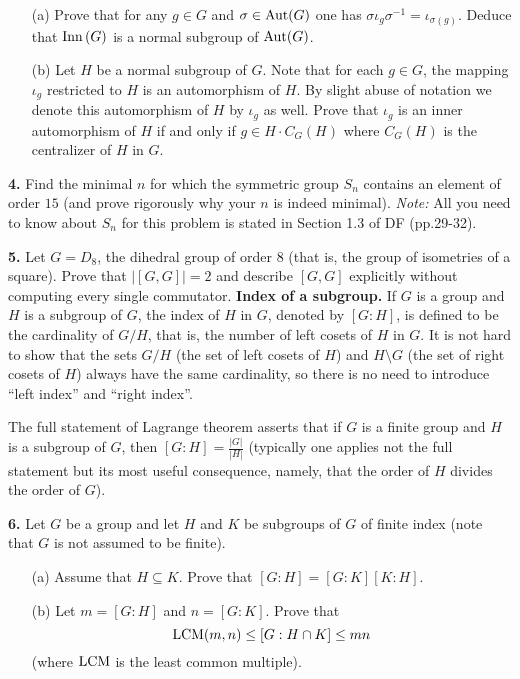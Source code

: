 \documentclass[12pt]{amsart}
\begin{document}
\begin{itemize}
\item[(a)] Prove that for any $g\in G$ and $\sigma\in {\rm Aut}(G)$
one has $\sigma \iota_g \sigma^{-1}=\iota_{\sigma(g)}$.
Deduce that ${\rm Inn\,}(G)$ is a normal subgroup of ${\rm Aut}(G)$.

\item[(b)] Let $H$ be a normal subgroup of $G$. Note that for each $g\in G$, 
the mapping $\iota_g$ restricted to $H$
is an automorphism of $H$. By slight abuse of notation
we denote this automorphism of $H$ by $\iota_g$ as well.
Prove that $\iota_g$ is an inner automorphism of $H$ if and
only if $g\in H\cdot C_{G}(H)$ where $C_G(H)$ is the centralizer
of $H$ in $G$.
\end{itemize}


\skv
{\bf 4.} Find the minimal $n$ for which the symmetric group $S_n$ contains an element of order $15$
(and prove rigorously why your $n$ is indeed minimal). {\it Note: }All you need to know about $S_n$ for this
problem is stated in Section 1.3 of DF (pp.29-32).

\skv
{\bf 5.} Let $G=D_8$, the dihedral group of order $8$ (that is, the group of isometries of a square). Prove that $|[G,G]|=2$ and describe $[G,G]$
explicitly without computing every single commutator. 
\skv
\skv
{\bf Index of a subgroup.} If $G$ is a group and $H$ is a subgroup of $G$, the index of $H$ in $G$, denoted by $[G:H]$, is
defined to be the cardinality of $G/H$, that is, the number of left cosets of $H$ in $G$.
It is not hard to show that the sets $G/H$ (the set of left cosets of $H$) and
$H\setminus G$ (the set of right cosets of $H$) always have the same cardinality, so there is no need to introduce ``left index'' and ``right index''. 

The full statement of Lagrange theorem asserts that if $G$ is a finite group and $H$ is a subgroup of $G$, then $[G:H]=\frac{|G|}{|H|}$ (typically one applies not the full statement but its most useful consequence, namely, that the order of $H$ divides the order of $G$).
\skv




{\bf 6.} Let $G$ be a group and let $H$ and $K$ be subgroups of $G$ of finite index
(note that $G$ is not assumed to be finite).

\begin{itemize}

\item[(a)] Assume that $H\subseteq K$. Prove that $[G:H]=[G:K][K:H]$.

\item[(b)] Let $m=[G:H]$ and $n=[G:K]$. Prove that
$${\rm LCM}(m,n)\leq [G:H\cap K]\leq  mn$$ 
(where ${\rm LCM}$ is the least common multiple).
\end{itemize}
\end{document}

